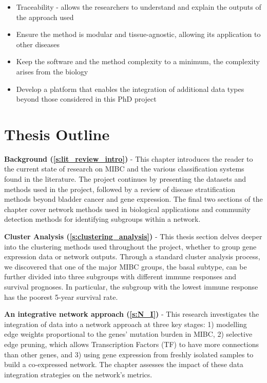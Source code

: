 \begin{itemize}
    \item Traceability - allows the researchers to understand and explain the outputs of the approach used
    \item Ensure the method is modular and tissue-agnostic, allowing its application to other diseases
    \item Keep the software and the method complexity to a minimum, the complexity arises from the biology
    \item Develop a platform that enables the integration of additional data types beyond those considered in this PhD project
\end{itemize}

\section{Thesis Outline}

\textbf{Background (\cref{s:lit_review_intro})} - This chapter introduces the reader to the current state of research on MIBC and the various classification systems found in the literature. The project continues by presenting the datasets and methods used in the project, followed by a review of disease stratification methods beyond bladder cancer and gene expression. The final two sections of the chapter cover network methods used in biological applications and community detection methods for identifying subgroups within a network.


\textbf{Cluster Analysis (\cref{s:clustering_analysis})} - This thesis section delves deeper into the clustering methods used throughout the project, whether to group gene expression data or network outputs. Through a standard cluster analysis process, we discovered that one of the major MIBC groups, the basal subtype, can be further divided into three subgroups with different immune responses and survival prognoses. In particular, the subgroup with the lowest immune response has the poorest 5-year survival rate.

\textbf{An integrative network approach (\cref{s:N_I})} - This research investigates the integration of data into a network approach at three key stages: 1) modelling edge weights proportional to the genes' mutation burden in MIBC, 2) selective edge pruning, which allows Transcription Factors (TF) to have more connections than other genes, and 3) using gene expression from freshly isolated samples to build a co-expressed network. 
The chapter assesses the impact of these data integration strategies on the network's metrics.


